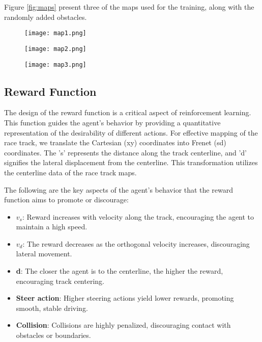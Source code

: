 \documentclass[a4paper, 10pt]{LTJournalArticle}
\begin{document}
Figure \ref{fig:maps} present three of the maps used for the training, along with the randomly added obstacles.

\begin{figure*}[!tb]
  \centering
  \begin{subfigure}[b]{0.33\textwidth}
    \texttt{[image: map1.png]}
  \end{subfigure}
  \hfill
  \begin{subfigure}[b]{0.33\textwidth}
    \texttt{[image: map2.png]}
  \end{subfigure}
  \hfill
  \begin{subfigure}[b]{0.32\textwidth}
    \texttt{[image: map3.png]}
  \end{subfigure}
  \caption{Three of the training maps with varying curvature and width. The random obstacles represent external real-world objects.}
  \label{fig:maps}
\end{figure*}

\subsection{Reward Function}
The design of the reward function is a critical aspect of reinforcement learning. This function guides the agent's behavior by providing a quantitative representation of the desirability of different actions. For effective mapping of the race track, we translate the Cartesian (xy) coordinates into Frenet (sd) coordinates. The 's' represents the distance along the track centerline, and 'd' signifies the lateral displacement from the centerline. This transformation utilizes the centerline data of the race track maps.

The following are the key aspects of the agent's behavior that the reward function aims to promote or discourage:

\begin{itemize}
\item \textbf{$v_s$}: Reward increases with velocity along the track, encouraging the agent to maintain a high speed.
\item \textbf{$v_d$}: The reward decreases as the orthogonal velocity increases, discouraging lateral movement.
\item \textbf{d}: The closer the agent is to the centerline, the higher the reward, encouraging track centering.
\item \textbf{Steer action}: Higher steering actions yield lower rewards, promoting smooth, stable driving.
\item \textbf{Collision}: Collisions are highly penalized, discouraging contact with obstacles or boundaries.
\end{itemize}
\end{document}
